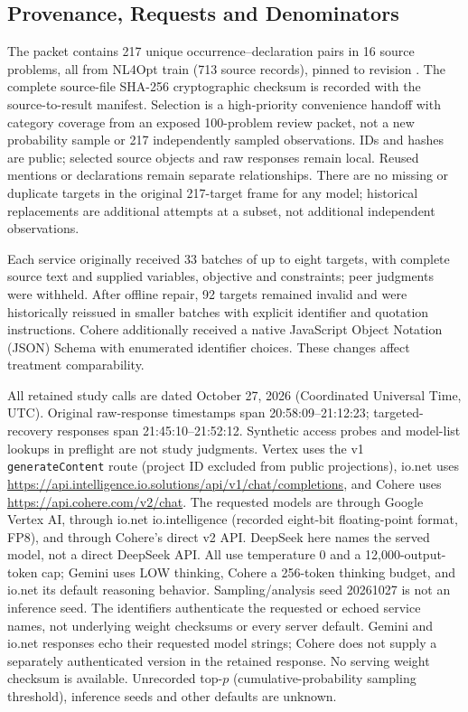 \subsection{Provenance, Requests and Denominators}\label{app:relationship-evidence}
The packet contains 217 unique occurrence--declaration pairs in 16 source problems, all from NL4Opt train (713 source records), pinned to revision . The complete source-file SHA-256 cryptographic checksum is recorded with the source-to-result manifest. Selection is a high-priority convenience handoff with category coverage from an exposed 100-problem review packet, not a new probability sample or 217 independently sampled observations. IDs and hashes are public; selected source objects and raw responses remain local. Reused mentions or declarations remain separate relationships. There are no missing or duplicate targets in the original 217-target frame for any model; historical replacements are additional attempts at a subset, not additional independent observations.

Each service originally received 33 batches of up to eight targets, with complete source text and supplied variables, objective and constraints; peer judgments were withheld. After offline repair, 92 targets remained invalid and were historically reissued in smaller batches with explicit identifier and quotation instructions. Cohere additionally received a native JavaScript Object Notation (JSON) Schema with enumerated identifier choices. These changes affect treatment comparability.

All retained study calls are dated October 27, 2026 (Coordinated Universal Time, UTC). Original raw-response timestamps span 20:58:09--21:12:23; targeted-recovery responses span 21:45:10--21:52:12. Synthetic access probes and model-list lookups in preflight are not study judgments. Vertex uses the v1 \texttt{generateContent} route (project ID excluded from public projections), io.net uses \url{https://api.intelligence.io.solutions/api/v1/chat/completions}, and Cohere uses \url{https://api.cohere.com/v2/chat}. The requested models are  through Google Vertex AI,  through io.net io.intelligence (recorded eight-bit floating-point format, FP8), and  through Cohere's direct v2 API. DeepSeek here names the served model, not a direct DeepSeek API. All use temperature 0 and a 12,000-output-token cap; Gemini uses LOW thinking, Cohere a 256-token thinking budget, and io.net its default reasoning behavior. Sampling/analysis seed 20261027 is not an inference seed. The identifiers authenticate the requested or echoed service names, not underlying weight checksums or every server default. Gemini and io.net responses echo their requested model strings; Cohere does not supply a separately authenticated version in the retained response. No serving weight checksum is available. Unrecorded top-$p$ (cumulative-probability sampling threshold), inference seeds and other defaults are unknown.

